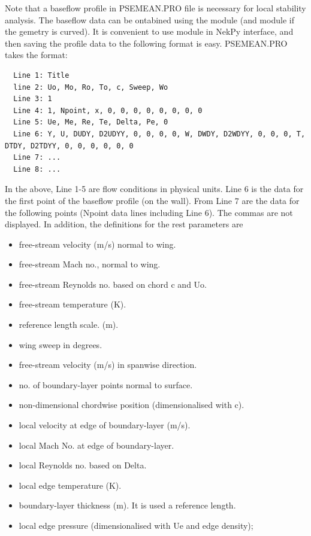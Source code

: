 Note that a baseflow profile in PSEMEAN.PRO file is necessary for local stability analysis. The baseflow data can be ontabined using the  module (and  module if the gemetry is curved).
It is convenient to use  module in NekPy interface, and then saving the profile data to the following format is easy.
PSEMEAN.PRO takes the format:
\begin{lstlisting}
  Line 1: Title
  line 2: Uo, Mo, Ro, To, c, Sweep, Wo
  Line 3: 1
  Line 4: 1, Npoint, x, 0, 0, 0, 0, 0, 0, 0, 0
  Line 5: Ue, Me, Re, Te, Delta, Pe, 0
  Line 6: Y, U, DUDY, D2UDYY, 0, 0, 0, 0, W, DWDY, D2WDYY, 0, 0, 0, T, DTDY, D2TDYY, 0, 0, 0, 0, 0, 0 
  Line 7: ...
  Line 8: ...
  \end{lstlisting}
In the above, Line 1-5 are flow conditions in physical units. Line 6 is the data for the first point of the baseflow profile (on the wall). 
From Line 7 are the data for the following points (Npoint data lines including Line 6). The commas are not displayed. 
In addition, the definitions for the rest parameters are
  \begin{itemize}
  \item {} free-stream velocity (m/s) normal to wing.
  \item {} free-stream Mach no., normal to wing.
  \item {} free-stream Reynolds no. based on chord c and Uo.
  \item {} free-stream temperature (K).
  \item {} reference length scale. (m).
  \item {} wing sweep in degrees.
  \item {} free-stream velocity (m/s) in spanwise direction.
  \item {} no. of boundary-layer points normal to surface.
  \item {} non-dimensional chordwise position (dimensionalised with c).
  \item {} local velocity at edge of boundary-layer (m/s).
  \item {} local Mach No. at edge of boundary-layer.
  \item {} local Reynolds no. based on Delta.
  \item {} local edge temperature (K).
  \item {} boundary-layer thickness (m). It is used a reference length.
  \item {} local edge pressure (dimensionalised with Ue and edge density);
  \end{itemize}

